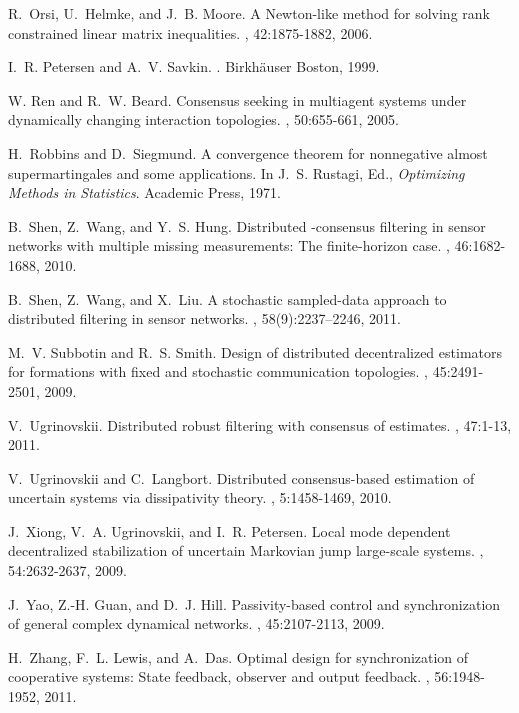 \documentclass[a4paper,twocolumn]{autart}
\begin{document}
\begin{thebibliography}{10}
R.~Orsi, U.~Helmke, and J.~B. Moore.
\newblock A {N}ewton-like method for solving rank constrained linear matrix
  inequalities.
, 42:1875-1882, 2006.

I.~R. Petersen and A.~V. Savkin.
.
\newblock Birkh\"{a}user Boston, 1999.

W. Ren and R.~W. Beard.
\newblock Consensus seeking in multiagent systems under dynamically changing
  interaction topologies.
, 50:655-661, 2005.

H.~Robbins and D.~Siegmund.
\newblock A convergence theorem for nonnegative almost supermartingales and
  some applications.
\newblock In J.~S. Rustagi, Ed., {\em Optimizing Methods in Statistics}.
  Academic Press, 1971.

B.~Shen, Z.~Wang, and Y.~S. Hung.
\newblock Distributed -consensus filtering in sensor networks with
  multiple missing measurements: {T}he finite-horizon case.
, 46:1682-1688, 2010.

B.~Shen, Z.~Wang, and X.~Liu.
\newblock A stochastic sampled-data approach to distributed 
  filtering in sensor networks.
,
  58(9):2237--2246, 2011.

M.~V. Subbotin and R.~S. Smith.
\newblock Design of distributed decentralized estimators for formations with
  fixed and stochastic communication topologies.
, 45:2491-2501, 2009.

V.~Ugrinovskii.
\newblock Distributed robust filtering with  consensus of
  estimates.
, 47:1-13, 2011.

V.~Ugrinovskii and C.~Langbort.
\newblock Distributed  consensus-based estimation of uncertain
  systems via dissipativity theory.
, 5:1458-1469, 2010.

J.~Xiong, V.~A. Ugrinovskii, and I.~R. Petersen.
\newblock Local mode dependent decentralized stabilization of uncertain
  {M}arkovian jump large-scale systems.
, 54:2632-2637,
  2009.

J.~Yao, Z.-H. Guan, and D.~J. Hill.
\newblock Passivity-based control and synchronization of general complex
  dynamical networks.
, 45:2107-2113, 2009.

H.~Zhang, F.~L. Lewis, and A.~Das.
\newblock Optimal design for synchronization of cooperative systems: {S}tate
  feedback, observer and output feedback.
, 56:1948-1952, 2011.

\end{thebibliography}
\end{document}
